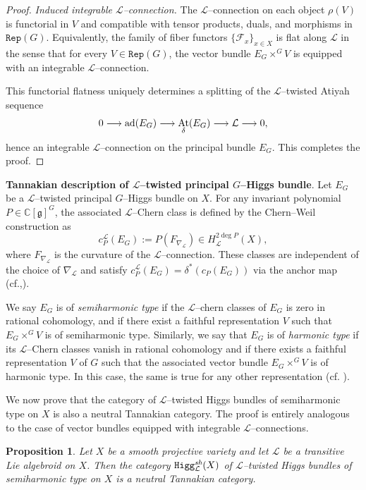 \documentclass[12pt,reqno]{amsart}
\DeclareMathOperator{\At}{{\rm At}}
\DeclareMathOperator{\ad}{{\rm ad}}
\numberwithin{equation}{subsection}
\newtheorem{proposition}[equation]{Proposition}
\theoremstyle{definition}
\theoremstyle{theorem}
\begin{document}
\begin{proof}
	\medskip
	
	\noindent\textit{Induced integrable $\mathcal{L}$--connection.}
	The $\mathcal{L}$--connection on each object $\rho(V)$ is functorial in $V$ and compatible with tensor products, duals, and morphisms in $\texttt{Rep}(G)$. Equivalently, the family of fiber functors $\{\mathscr{F}_x\}_{x\in X}$ is flat along $\mathcal{L}$ in the sense that for every $V\in\texttt{Rep}(G)$, the vector bundle $E_G\times^{G}V$ is equipped with an integrable $\mathcal{L}$--connection.
	
	This functorial flatness uniquely determines a splitting of the $\mathcal{L}$--twisted Atiyah sequence
	\[
	0\longrightarrow \ad(E_G)\longrightarrow \At_{\delta}(E_G)\longrightarrow \mathcal{L}\longrightarrow 0,
	\]
	hence an integrable $\mathcal{L}$--connection on the principal bundle $E_G$.  
	This completes the proof.
\end{proof}

                          
                          
\medskip

\noindent\textbf{Tannakian description of $\mathcal{L}$--twisted principal $G$--Higgs bundle}. Let $E_G$ be a $\mathcal{L}$--twisted principal $G$--Higgs bundle on $X$. For any invariant polynomial
$P \in \mathbb{C}[\mathfrak g]^G$, the associated $\mathcal L$--Chern class
is defined by the Chern--Weil construction as
\[
c^{\mathcal L}_P(E_G) := P(F_{\nabla_{\mathcal L}}) \in H^{2\deg P}_{\mathcal L}(X),
\]
where $F_{\nabla_{\mathcal L}}$ is the curvature of the $\mathcal L$--connection.
These classes are independent of the choice of $\nabla_{\mathcal L}$ and
satisfy $c^{\mathcal L}_P(E_G)=\delta^*(c_P(E_G))$ via the anchor map (cf.\cite{PM-2020},\cite{Crainic-2009}).

We say $E_{G}$ is of
\textit{semiharmonic type} if the $\mathcal{L}$--chern classes of $E_{G}$ is zero in rational cohomology, and if there exist a faithful representation $V$ such that $E_{G}\times^{G}V$ is of semiharmonic type. Similarly, we say that $E_{G}$ is of \emph{harmonic type} if its
$\mathcal{L}$--Chern classes vanish in rational cohomology and if there
exists a faithful representation $V$ of $G$ such that the associated
vector bundle $E_{G}\times^{G} V$ is of harmonic type. In this case, the same is true for any other representation (cf. \cite[\S\,6, remarks after lemma 6.13]{CT. Simpson-1992}).



We now prove that the category of $\mathcal{L}$--twisted Higgs bundles of
semiharmonic type on $X$ is also a neutral Tannakian category.  
The proof is entirely analogous to the case of vector bundles equipped with integrable $\mathcal{L}$--connections.
\begin{proposition}\label{prop:Tannakian-L-Higgs}
	Let $X$ be a smooth projective variety and let $\mathcal L$ be a transitive Lie algebroid on $X$.  
	Then the category $\texttt{Higg}^{\emph{sh}}_{\mathcal L}(X)$ of
	$\mathcal L$--twisted Higgs bundles of semiharmonic type on $X$ is a
	neutral Tannakian category.
\end{proposition}
\end{document}
